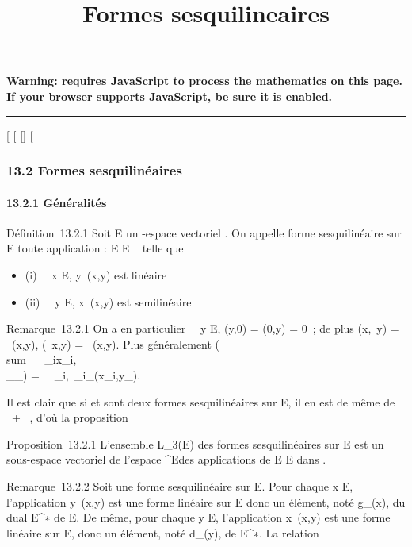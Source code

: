 \documentclass[]{article}
\title{Formes sesquilineaires}
\author{}
\date{}
\begin{document}
\maketitle

\textbf{Warning: 
requires JavaScript to process the mathematics on this page.\\ If your
browser supports JavaScript, be sure it is enabled.}

\begin{center}\rule{3in}{0.4pt}\end{center}

{[}
{[}
{[}{]}
{[}

\subsubsection{13.2 Formes sesquilinéaires}

\paragraph{13.2.1 Généralités}

Définition~13.2.1 Soit E un -espace vectoriel . On appelle forme
sesquilinéaire sur E toute application \phi : E \times E \rightarrow~  telle que

\begin{itemize}
\itemsep1pt\parskip0pt
\item
  (i) \forall~~x \in E,
  y\mapsto~\phi(x,y) est linéaire
\item
  (ii) \forall~~y \in E,
  x\mapsto~\phi(x,y) est semilinéaire
\end{itemize}

Remarque~13.2.1 On a en particulier \forall~~y \in E,
\phi(y,0) = \phi(0,y) = 0~; de plus \phi(x,\lambda~y) = \lambda~\phi(x,y), \phi(\lambda~x,y) =
\overline\lambda~\phi(x,y). Plus généralement
\phi(\\sum ~
\lambda~\_ix\_i,\\\sum
 \mu\_\jmathy\_\jmath) =\
\sum ~
\_i,\jmath\overline\lambda~\_i\mu\_\jmath\phi(x\_i,y\_\jmath).

Il est clair que si \phi et \psi sont deux formes sesquilinéaires sur E, il en
est de même de \alpha~\phi + \beta~\psi, d'où la proposition

Proposition~13.2.1 L'ensemble L\_3(E) des formes
sesquilinéaires sur E est un sous-espace vectoriel de l'espace
^E\timesE des applications de E \times E dans .

Remarque~13.2.2 Soit \phi une forme sesquilinéaire sur E. Pour chaque x \in
E, l'application y\mapsto~\phi(x,y) est une forme
linéaire sur E donc un élément, noté g\_\phi(x), du dual
E^∗ de E. De même, pour chaque y \in E, l'application
x\mapsto~\overline\phi(x,y) est une
forme linéaire sur E, donc un élément, noté d\_\phi(y), de
E^∗. La relation
\end{document}
